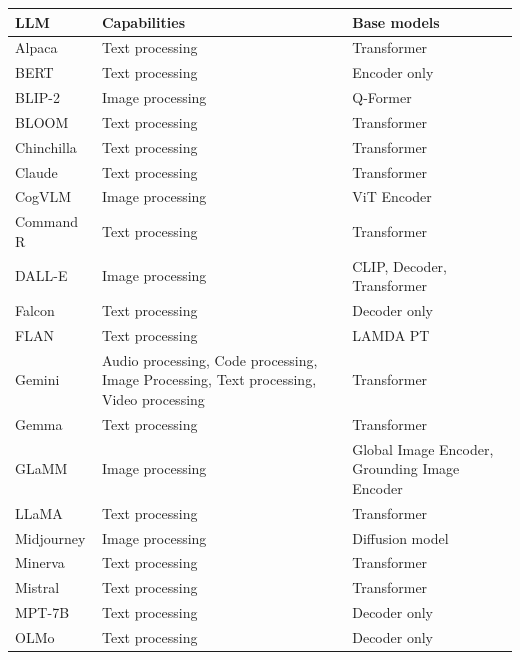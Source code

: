\begin{table}[H]
    \footnotesize %
    \centering
    \begin{tabular}{|>{\raggedright\arraybackslash}p{4cm}|>{\raggedright\arraybackslash}p{4cm}|>{\raggedright\arraybackslash}p{4cm}|}
        \hline
        \textbf{LLM} & \textbf{Capabilities} & \textbf{Base models} \\ \hline
        Alpaca & Text processing & Transformer\\ \hline
        BERT & Text processing & Encoder only \\ \hline
        BLIP-2 & Image processing & Q-Former \\ \hline
        BLOOM & Text processing & Transformer \\ \hline
        Chinchilla & Text processing & Transformer \\ \hline
        Claude & Text processing & Transformer \\ \hline
        CogVLM & Image processing & ViT Encoder \\ \hline
        Command R & Text processing & Transformer \\ \hline
        DALL-E & Image processing & CLIP, Decoder, Transformer \\ \hline
        Falcon & Text processing & Decoder only \\ \hline
        FLAN & Text processing & LAMDA PT \\ \hline
        Gemini & Audio processing, Code processing, Image Processing, Text processing, Video processing & Transformer\\ \hline
        Gemma & Text processing & Transformer \\ \hline
        GLaMM & Image processing & Global Image Encoder, Grounding Image Encoder \\ \hline
        LLaMA & Text processing & Transformer \\ \hline
        Midjourney & Image processing & Diffusion model  \\ \hline
        Minerva & Text processing & Transformer \\ \hline
        Mistral & Text processing & Transformer \\ \hline
        MPT-7B & Text processing & Decoder only \\ \hline
        OLMo & Text processing & Decoder only \\ \hline

\end{tabular}
\end{table}
